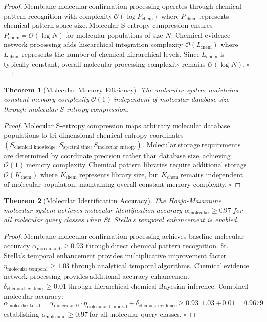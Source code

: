 \documentclass[11pt,a4paper]{article}
\newtheorem{theorem}{Theorem}[section]
\theoremstyle{remark}
\begin{document}
\begin{proof}
Membrane molecular confirmation processing operates through chemical pattern recognition with complexity $\mathcal{O}(\log P_{\text{chem}})$ where $P_{\text{chem}}$ represents chemical pattern space size. Molecular S-entropy compression ensures $P_{\text{chem}} = \mathcal{O}(\log N)$ for molecular populations of size $N$. Chemical evidence network processing adds hierarchical integration complexity $\mathcal{O}(L_{\text{chem}})$ where $L_{\text{chem}}$ represents the number of chemical hierarchical levels. Since $L_{\text{chem}}$ is typically constant, overall molecular processing complexity remains $\mathcal{O}(\log N)$. $\square$
\end{proof}

\begin{theorem}[Molecular Memory Efficiency]
The molecular system maintains constant memory complexity $\mathcal{O}(1)$ independent of molecular database size through molecular S-entropy compression.
\end{theorem}

\begin{proof}
Molecular S-entropy compression maps arbitrary molecular database populations to tri-dimensional chemical entropy coordinates $(S_{\text{chemical knowledge}}, S_{\text{spectral time}}, S_{\text{molecular entropy}})$. Molecular storage requirements are determined by coordinate precision rather than database size, achieving $\mathcal{O}(1)$ memory complexity. Chemical pattern libraries require additional storage $\mathcal{O}(K_{\text{chem}})$ where $K_{\text{chem}}$ represents library size, but $K_{\text{chem}}$ remains independent of molecular population, maintaining overall constant memory complexity. $\square$
\end{proof}

\begin{theorem}[Molecular Identification Accuracy]
The Honjo-Masamune molecular system achieves molecular identification accuracy $\alpha_{\text{molecular}} \geq 0.97$ for all molecular query classes when St. Stella's temporal enhancement is enabled.
\end{theorem}

\begin{proof}
Membrane molecular confirmation processing achieves baseline molecular accuracy $\alpha_{\text{molecular},0} \geq 0.93$ through direct chemical pattern recognition. St. Stella's temporal enhancement provides multiplicative improvement factor $\eta_{\text{molecular temporal}} \geq 1.03$ through analytical temporal algorithms. Chemical evidence network processing provides additional accuracy enhancement $\delta_{\text{chemical evidence}} \geq 0.01$ through hierarchical chemical Bayesian inference. Combined molecular accuracy:
\begin{equation}
\alpha_{\text{molecular total}} = \alpha_{\text{molecular},0} \cdot \eta_{\text{molecular temporal}} + \delta_{\text{chemical evidence}} \geq 0.93 \cdot 1.03 + 0.01 = 0.9679
\end{equation}
establishing $\alpha_{\text{molecular}} \geq 0.97$ for all molecular query classes. $\square$
\end{proof}
\end{document}
